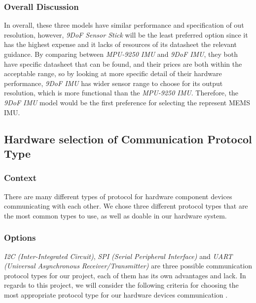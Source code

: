 \hfill \break
\subsubsection{Overall Discussion}
In overall, these three models have similar performance and specification of out resolution, however, \textit{9DoF Sensor Stick} will be the least preferred option since it has the highest expense and it lacks of resources of its datasheet the relevant guidance. By comparing between \textit{MPU-9250 IMU} and \textit{9DoF IMU}, they both have specific datasheet that can be found, and their prices are both within the acceptable range, so by looking at more specific detail of their hardware performance, \textit{9DoF IMU} has wider sensor range to choose for its output resolution, which is more functional than the \textit{MPU-9250 IMU}. Therefore, the \textit{9DoF IMU} model would be the first preference for selecting the represent MEMS IMU.




\subsection{Hardware selection of Communication Protocol Type}
\subsubsection{Context}
There are many different types of protocol for hardware component devices communicating with each other. We chose three different protocol types that are the most common types to use, as well as doable in our hardware system.\\

\subsubsection{Options}
\textit{I2C (Inter-Integrated Circuit)}, \textit{SPI (Serial Peripheral Interface)} and \textit{UART (Universal Asynchronous Receiver/Transmitter)} are three possible communication protocol types for our project, each of them has its own advantages and lack. In regards to this project, we will consider the following criteria for choosing the most appropriate protocol type for our hardware devices communication \cite{protocol1}.\\


